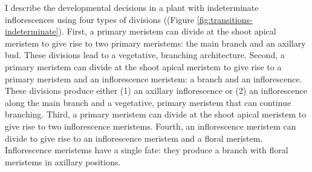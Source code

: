\documentclass[12pt, oneside,titlepage]{article}   	%
\begin{document}
I describe the developmental decisions in a plant with indeterminate inflorescences using four types of divisions ((Figure \ref{fig:transitions-indeterminate}). First, a primary meristem can divide at the shoot apical meristem to give rise to two primary meristems: the main branch and an axillary bud. These divisions lead to a vegetative, branching architecture. Second, a primary meristem can divide at the shoot apical meristem to give rise to a primary meristem and an inflorescence meristem: a branch and an inflorescence. These divisions  produce either (1) an axillary inflorescence or (2) an inflorescence along the main branch and a vegetative, primary meristem that can continue branching. Third, a primary meristem can divide at the shoot apical meristem to give rise to two inflorescence meristems. Fourth, an inflorescence meristem can divide to give rise to an inflorescence meristem and a floral meristem. Inflorescence meristems have a single fate: they produce a branch with floral meristems in axillary positions.
\end{document}
